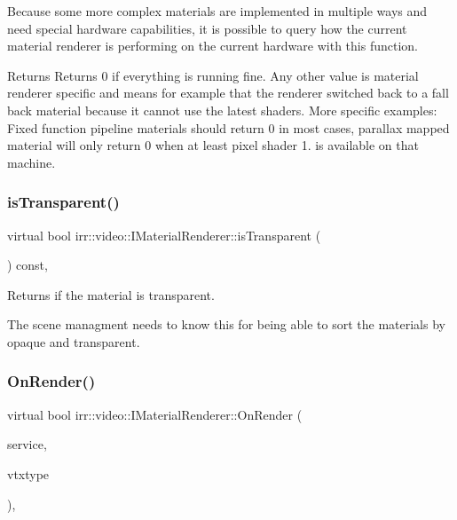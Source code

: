 Because some more complex materials are implemented in multiple ways and need special hardware capabilities, it is possible to query how the current material renderer is performing on the current hardware with this function. \begin{DoxyReturn}{Returns}
Returns 0 if everything is running fine. Any other value is material renderer specific and means for example that the renderer switched back to a fall back material because it cannot use the latest shaders. More specific examples\+: Fixed function pipeline materials should return 0 in most cases, parallax mapped material will only return 0 when at least pixel shader 1. is available on that machine. 
\end{DoxyReturn}
\mbox{\label{classirr_1_1video_1_1IMaterialRenderer_ac472a5832eed8d848240c82278e56312}} 
\subsubsection{\texorpdfstring{is\+Transparent()}{isTransparent()}}
{\footnotesize\ttfamily virtual bool irr\+::video\+::\+I\+Material\+Renderer\+::is\+Transparent (\begin{DoxyParamCaption}{ }\end{DoxyParamCaption}) const\hspace{0.3cm}{\ttfamily [inline]}, {\ttfamily [virtual]}}



Returns if the material is transparent. 

The scene managment needs to know this for being able to sort the materials by opaque and transparent. \mbox{\label{classirr_1_1video_1_1IMaterialRenderer_a8cb6c5f93856de7586a318f14ed21a22}} 
\subsubsection{\texorpdfstring{On\+Render()}{OnRender()}}
{\footnotesize\ttfamily virtual bool irr\+::video\+::\+I\+Material\+Renderer\+::\+On\+Render (\begin{DoxyParamCaption}\item[{\hyperlink{classirr_1_1video_1_1IMaterialRendererServices}{I\+Material\+Renderer\+Services} $\ast$}]{service,  }\item[{\hyperlink{namespaceirr_1_1video_a0e3b59e025e0d0db0ed2ee0ce904deac}{E\+\_\+\+V\+E\+R\+T\+E\+X\+\_\+\+T\+Y\+PE}}]{vtxtype }\end{DoxyParamCaption})\hspace{0.3cm}{\ttfamily [inline]}, {\ttfamily [virtual]}}



